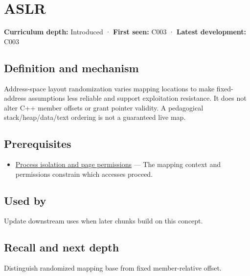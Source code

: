 \hypertarget{appendix-78cb248c8355}{}\label{referencestart:appendix-78cb248c8355}
\section{ASLR}\label{appendix-78cb248c8355-aslr}

\textbf{Curriculum depth:} Introduced · \textbf{First seen:} C003 · \textbf{Latest development:} C003

\begin{allmightroledefinition}

\subsection{Definition and mechanism}\label{appendix-78cb248c8355-definition-and-mechanism}

Address-space layout randomization varies mapping locations to make fixed-address assumptions less reliable and support exploitation resistance. It does not alter C++ member offsets or grant pointer validity. A pedagogical stack/heap/data/text ordering is not a guaranteed live map.

\end{allmightroledefinition}

\subsection{Prerequisites}\label{appendix-78cb248c8355-prerequisites}

\begin{itemize}
\tightlist
\item
  \hyperref[appendix-c2a9ad1e2b49]{Process isolation and page permissions} --- The mapping context and permissions constrain which accesses proceed.
\end{itemize}

\subsection{Used by}\label{appendix-78cb248c8355-used-by}

Update downstream uses when later chunks build on this concept.

\subsection{Recall and next depth}\label{appendix-78cb248c8355-recall-and-next-depth}

Distinguish randomized mapping base from fixed member-relative offset.

